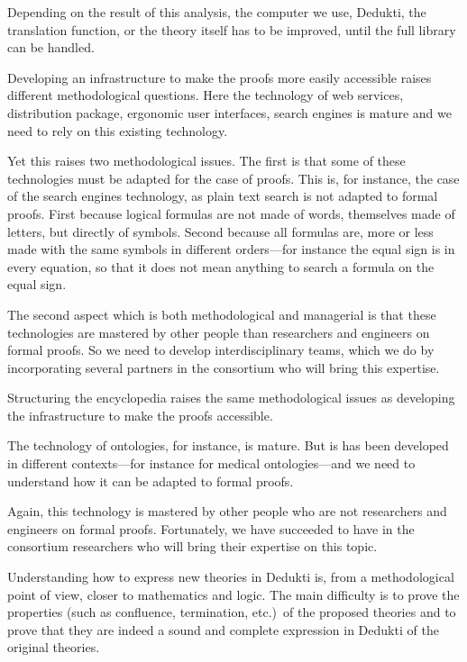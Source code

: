Depending on the result of this analysis, the computer we use, Dedukti,
the translation function, or the theory itself has to be improved, until
the full library can be handled.


Developing an infrastructure to make the proofs more easily accessible
raises different methodological questions. Here the technology of web
services, distribution package, ergonomic user interfaces, search
engines is mature and we need to rely on this existing technology.

Yet this raises two methodological issues. The first is that some of
these technologies must be adapted for the case of proofs. This is,
for instance, the case of the search engines technology, as plain text
search is not adapted to formal proofs. First because logical formulas
are not made of words, themselves made of letters, but directly of
symbols. Second because all formulas are, more or less made with the
same symbols in different orders---for instance the equal sign is in
every equation, so that it does not mean anything to search a formula
on the equal sign.

The second aspect which is both methodological and managerial is that
these technologies are mastered by other people than researchers and
engineers on formal proofs. So we need to develop interdisciplinary
teams, which we do by incorporating several partners in the consortium
who will bring this expertise.


Structuring the encyclopedia raises the same methodological issues
as developing the infrastructure to make the proofs accessible.

The technology of ontologies, for instance, is mature. But is has been
developed in different contexts---for instance for medical
ontologies---and we need to understand how it can be adapted to formal
proofs.

Again, this technology is mastered by other people who are not
researchers and engineers on formal proofs. Fortunately, we have
succeeded to have in the consortium researchers who will bring their
expertise on this topic.


Understanding how to express new theories in Dedukti is, from a
methodological point of view, closer to mathematics and logic.  The
main difficulty is to prove the properties (such as confluence,
termination, etc.)~of the proposed theories and to prove that they are
indeed a sound and complete expression in Dedukti of the original
theories.

